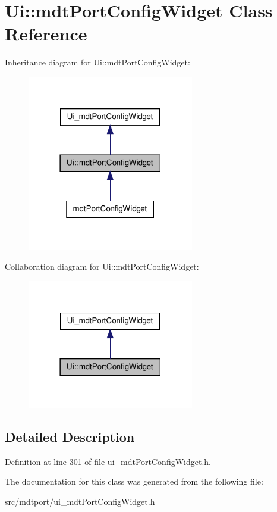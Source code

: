 \hypertarget{class_ui_1_1mdt_port_config_widget}{
\section{Ui::mdtPortConfigWidget Class Reference}
\label{class_ui_1_1mdt_port_config_widget}
}


Inheritance diagram for Ui::mdtPortConfigWidget:\nopagebreak
\begin{figure}[H]
\begin{center}
\leavevmode
\includegraphics[width=206pt]{class_ui_1_1mdt_port_config_widget__inherit__graph}
\end{center}
\end{figure}


Collaboration diagram for Ui::mdtPortConfigWidget:\nopagebreak
\begin{figure}[H]
\begin{center}
\leavevmode
\includegraphics[width=206pt]{class_ui_1_1mdt_port_config_widget__coll__graph}
\end{center}
\end{figure}


\subsection{Detailed Description}


Definition at line 301 of file ui\_\-mdtPortConfigWidget.h.



The documentation for this class was generated from the following file:\begin{DoxyCompactItemize}
\item 
src/mdtport/ui\_\-mdtPortConfigWidget.h\end{DoxyCompactItemize}

